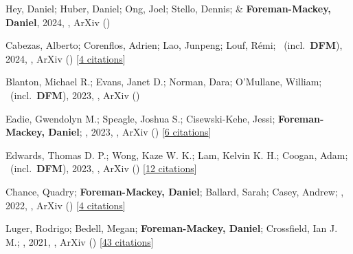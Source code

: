 \item[{\color{numcolor}\scriptsize11}] Hey, Daniel; Huber, Daniel; Ong, Joel; Stello, Dennis; \& \textbf{Foreman-Mackey, Daniel}, 2024, , ArXiv ()

\item[{\color{numcolor}\scriptsize10}] Cabezas, Alberto; Corenflos, Adrien; Lao, Junpeng; Louf, R{\'e}mi; \etal\ (incl.\ \textbf{DFM}), 2024, , ArXiv () [\href{https://ui.adsabs.harvard.edu/abs/2024arXiv240210797C}{4 citations}]

\item[{\color{numcolor}\scriptsize9}] Blanton, Michael R.; Evans, Janet D.; Norman, Dara; O'Mullane, William; \etal\ (incl.\ \textbf{DFM}), 2023, , ArXiv ()

\item[{\color{numcolor}\scriptsize8}] Eadie, Gwendolyn M.; Speagle, Joshua S.; Cisewski-Kehe, Jessi; \textbf{Foreman-Mackey, Daniel}; \etal, 2023, , ArXiv () [\href{https://ui.adsabs.harvard.edu/abs/2023arXiv230204703E}{6 citations}]

\item[{\color{numcolor}\scriptsize7}] Edwards, Thomas D. P.; Wong, Kaze W. K.; Lam, Kelvin K. H.; Coogan, Adam; \etal\ (incl.\ \textbf{DFM}), 2023, , ArXiv () [\href{https://ui.adsabs.harvard.edu/abs/2023arXiv230205329E}{12 citations}]

\item[{\color{numcolor}\scriptsize6}] Chance, Quadry; \textbf{Foreman-Mackey, Daniel}; Ballard, Sarah; Casey, Andrew; \etal, 2022, , ArXiv () [\href{https://ui.adsabs.harvard.edu/abs/2022arXiv220611275C}{4 citations}]

\item[{\color{numcolor}\scriptsize5}] Luger, Rodrigo; Bedell, Megan; \textbf{Foreman-Mackey, Daniel}; Crossfield, Ian J. M.; \etal, 2021, , ArXiv () [\href{https://ui.adsabs.harvard.edu/abs/2021arXiv211006271L}{43 citations}]

